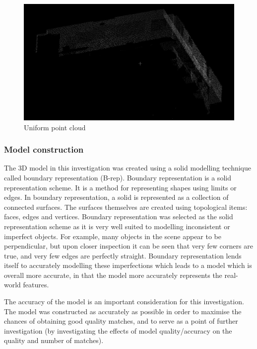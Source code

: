 \documentclass[11pt,a4paper]{report}
\begin{document}
				\begin{figure}[H]
					\centering
					\includegraphics[width=1\textwidth]{uniform_point_cloud_1}
					\caption{Uniform point cloud}
				\end{figure}
			
			\subsubsection{Model construction}
				The 3D model in this investigation was created using a solid modelling technique called boundary representation (B-rep). Boundary representation is a solid representation scheme. It is a method for representing shapes using limits or edges. In boundary representation, a solid is represented as a collection of connected surfaces. The surfaces themselves are created using topological items: faces, edges and vertices.
				\cite{hongxin_zhang_introduction_2007}
				Boundary representation was selected as the solid representation scheme as it is very well suited to modelling inconsistent or imperfect objects. For example, many objects in the scene appear to be perpendicular, but upon closer inspection it can be seen that very few corners are true, and very few edges are perfectly straight. Boundary representation lends itself to accurately modelling these imperfections which leads to a model which is overall more accurate, in that the model more accurately represents the real-world features.
				
				The accuracy of the model is an important consideration for this investigation. The model was constructed as accurately as possible in order to maximise the chances of obtaining good quality matches, and to serve as a point of further investigation (by investigating the effects of model quality/accuracy on the quality and number of matches).
				
\end{document}
